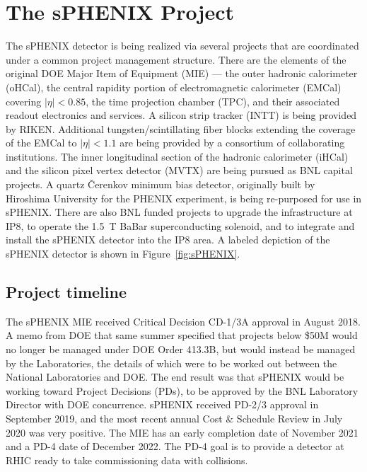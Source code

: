 \chapter{The sPHENIX Project}
\label{chap:project}

The sPHENIX detector is being realized via several projects that are
coordinated under a common project management structure.  There are
the elements of the original DOE Major Item of Equipment (MIE) --- the outer hadronic calorimeter (oHCal), the
central rapidity portion of electromagnetic calorimeter (EMCal)
covering $|\eta| < 0.85$, the time projection chamber (TPC), and their
associated readout electronics and services.  A silicon strip tracker
(INTT) is being provided by RIKEN.  Additional tungsten/scintillating
fiber blocks extending the coverage of the EMCal to $|\eta| < 1.1$ are
being provided by a consortium of collaborating institutions.
The inner longitudinal section of the hadronic calorimeter (iHCal) and
the silicon pixel vertex detector (MVTX) are being pursued as BNL
capital projects.  A quartz \v{C}erenkov minimum bias detector,
originally built by Hiroshima University for the PHENIX experiment, is
being re-purposed for use in sPHENIX.  There are also BNL funded
projects to upgrade the infrastructure at IP8, to operate the 1.5~T BaBar
superconducting solenoid, and to integrate and
install the sPHENIX detector into the IP8 area.  A labeled depiction of the
sPHENIX detector is shown in Figure~\ref{fig:sPHENIX}.

\section{Project timeline}
\label{sec:timeline}

The sPHENIX MIE received Critical Decision CD-1/3A approval in August
2018.  A memo from DOE that same summer specified that projects below
\$50M would no longer be managed under DOE Order 413.3B, but would
instead be managed by the Laboratories, the details of which were to
be worked out between the National Laboratories and DOE.  The end
result was that sPHENIX would be working toward Project Decisions
(PDs), to be approved by the BNL Laboratory Director with DOE
concurrence.  sPHENIX received PD-2/3 approval in September 2019, and
the most recent annual Cost \& Schedule Review in July 2020 was very
positive.  The MIE has an early completion date of November 2021 and a
PD-4 date of December 2022.  The PD-4 goal is to provide a detector at
RHIC ready to take commissioning data with collisions.

